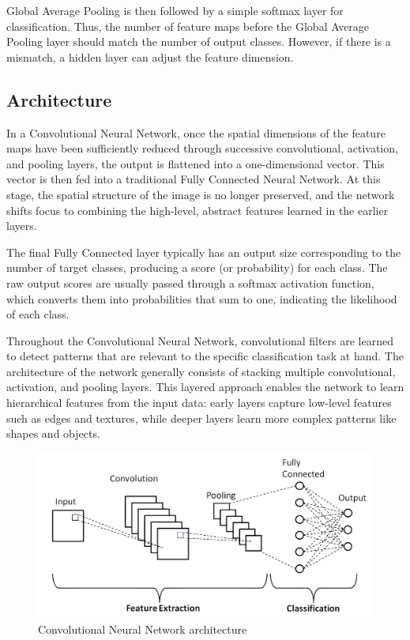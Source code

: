 Global Average Pooling is then followed by a simple softmax layer for classification. 
Thus, the number of feature maps before the Global Average Pooling layer should match the number of output classes. 
However, if there is a mismatch, a hidden layer can adjust the feature dimension.

\subsection{Architecture}
In a Convolutional Neural Network, once the spatial dimensions of the feature maps have been sufficiently reduced through successive convolutional, activation, and pooling layers, the output is flattened into a one-dimensional vector.
This vector is then fed into a traditional Fully Connected Neural Network.
At this stage, the spatial structure of the image is no longer preserved, and the network shifts focus to combining the high-level, abstract features learned in the earlier layers.

The final Fully Connected layer typically has an output size corresponding to the number of target classes, producing a score (or probability) for each class. 
The raw output scores are usually passed through a softmax activation function, which converts them into probabilities that sum to one, indicating the likelihood of each class.

Throughout the Convolutional Neural Network, convolutional filters are learned to detect patterns that are relevant to the specific classification task at hand. 
The architecture of the network generally consists of stacking multiple convolutional, activation, and pooling layers. 
This layered approach enables the network to learn hierarchical features from the input data: early layers capture low-level features such as edges and textures, while deeper layers learn more complex patterns like shapes and objects.
\begin{figure}[H]
    \centering
    \includegraphics[width=0.75\linewidth]{images/cnn1.png}
    \caption{Convolutional Neural Network architecture}
\end{figure}

